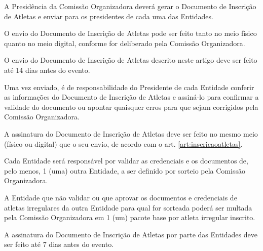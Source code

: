 \begin{article}
    \label{art:inscricaoatletas}
    A Presidência da Comissão Organizadora deverá gerar o Documento de Inscrição de Atletas e enviar para os presidentes de cada uma das Entidades.

	\begin{xparagraph}
	    O envio do Documento de Inscrição de Atletas pode ser feito tanto no meio físico quanto no meio digital, conforme for deliberado pela Comissão Organizadora.
	\end{xparagraph}

	\begin{xparagraph}
	    O envio do Documento de Inscrição de Atletas descrito neste artigo deve ser feito até 14 dias antes do evento.
	\end{xparagraph}
\end{article}

\begin{article}
    \label{art:presidentesassinar}
    Uma vez enviado, é de responsabilidade do Presidente de cada Entidade conferir as informações do Documento de Inscrição de Atletas e assiná-lo para confirmar a validade do documento ou apontar quaisquer erros para que sejam corrigidos pela Comissão Organizadora.

	\begin{xparagraph}
	    A assinatura do Documento de Inscrição de Atletas deve ser feito no mesmo meio (físico ou digital) que o seu envio, de acordo com o art. \ref{art:inscricaoatletas}\ulo.
	\end{xparagraph}

	\begin{xparagraph}
        Cada Entidade será responsável por validar as credenciais e os documentos de, pelo menos, 1 (uma) outra Entidade, a ser definido por sorteio pela Comissão Organizadora.
	\end{xparagraph}

	\begin{xparagraph}
        A Entidade que não validar ou que aprovar os documentos e credenciais de atletas irregulares da outra Entidade para qual for sorteada poderá ser multada pela Comissão Organizadora em 1 (um) pacote base por atleta irregular inscrito.
	\end{xparagraph}

	\begin{xparagraph}
	    A assinatura do Documento de Inscrição de Atletas por parte das Entidades deve ser feito até 7 dias antes do evento.
	\end{xparagraph}
\end{article}

